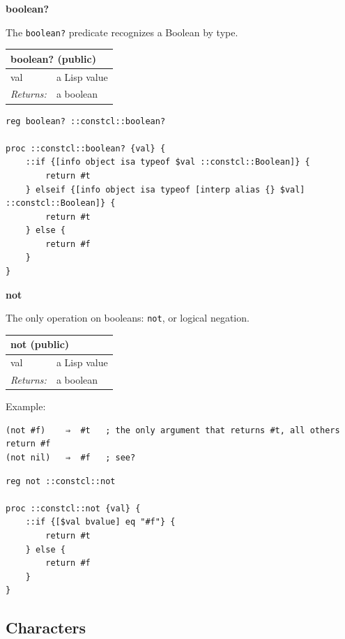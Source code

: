 \documentclass[twoside,9pt]{report}
\begin{document}
\textbf{boolean?}


The \texttt{boolean?} predicate recognizes a Boolean by type.

\begin{tabular}{ |l l| }
\hline
\multicolumn{2}{|l|}{boolean? (public)} \\
\hline
val & a Lisp value \\
\textit{Returns:} & a boolean \\
\hline
\end{tabular}

\noindent\makebox[\linewidth]{\rule{\linewidth}{0.4pt}}
\begin{lstlisting}
reg boolean? ::constcl::boolean?
 
proc ::constcl::boolean? {val} {
    ::if {[info object isa typeof $val ::constcl::Boolean]} {
        return #t
    } elseif {[info object isa typeof [interp alias {} $val] ::constcl::Boolean]} {
        return #t
    } else {
        return #f
    }
}
\end{lstlisting}
\noindent\makebox[\linewidth]{\rule{\linewidth}{0.4pt}}

\textbf{not}


The only operation on booleans: \texttt{not}, or logical negation.

\begin{tabular}{ |l l| }
\hline
\multicolumn{2}{|l|}{not (public)} \\
\hline
val & a Lisp value \\
\textit{Returns:} & a boolean \\
\hline
\end{tabular}


Example:

\noindent\makebox[\linewidth]{\rule{\linewidth}{0.4pt}}
\begin{lstlisting}
(not #f)    ⇒  #t   ; the only argument that returns #t, all others return #f
(not nil)   ⇒  #f   ; see?
\end{lstlisting}
\noindent\makebox[\linewidth]{\rule{\linewidth}{0.4pt}}
\noindent\makebox[\linewidth]{\rule{\linewidth}{0.4pt}}
\begin{lstlisting}
reg not ::constcl::not
 
proc ::constcl::not {val} {
    ::if {[$val bvalue] eq "#f"} {
        return #t
    } else {
        return #f
    }
}
\end{lstlisting}
\noindent\makebox[\linewidth]{\rule{\linewidth}{0.4pt}}
\subsection{Characters}
\label{characters}
\end{document}
